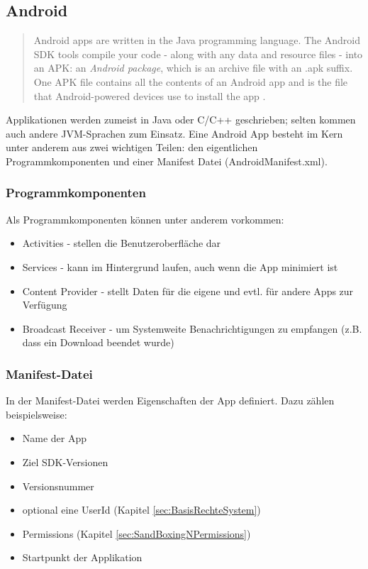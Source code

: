 \subsection{Android}\label{sec:app-android}
	\begin{quote}
	Android apps are written in the Java programming language. The Android SDK
	tools compile your code - along with any data and resource files - into an
	APK: an \textit{Android package}, which is an archive file with an .apk
	suffix. One APK file contains all the contents of an Android app and is the
	file that Android-powered devices use to install the app \cite{AndroidApp}.
	\end{quote}
	Applikationen werden zumeist in Java oder C/C++ geschrieben; selten kommen
	auch andere JVM-Sprachen zum Einsatz. Eine Android App besteht im Kern unter
	anderem aus zwei wichtigen Teilen: den eigentlichen Programmkomponenten und
	einer Manifest Datei (AndroidManifest.xml).
	
	\subsubsection{Programmkomponenten}
	Als Programmkomponenten können unter anderem vorkommen:
	\begin{itemize}\itemsep0pt
		\item Activities - stellen die Benutzeroberfläche dar
		\item Services - kann im Hintergrund laufen, auch wenn die App minimiert ist
		\item Content Provider - stellt Daten für die eigene und evtl. für andere Apps
		zur Verfügung
		\item Broadcast Receiver - um Systemweite Benachrichtigungen zu empfangen
		(z.B. dass ein Download beendet wurde)
	\end{itemize}
	\subsubsection{Manifest-Datei}
	In der Manifest-Datei werden Eigenschaften der App definiert. Dazu zählen
	beispielsweise:
	\begin{itemize}\itemsep0pt
		\item Name der App
		\item Ziel SDK-Versionen
		\item Versionsnummer
		\item optional eine UserId (Kapitel \ref{sec:BasisRechteSystem})
		\item Permissions (Kapitel \ref{sec:SandBoxingNPermissions})
		\item Startpunkt der Applikation
	\end{itemize}
